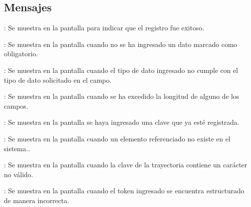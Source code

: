 \subsection{Mensajes}

\begin{Citemize}
	\item {}: Se muestra en la pantalla  para indicar que el registro fue exitoso.
	\item {}: Se muestra en la pantalla  cuando no se ha ingresado un dato marcado como obligatorio.
	\item {}: Se muestra en la pantalla  cuando el tipo de dato ingresado no cumple con el tipo de dato solicitado en el campo.
	\item {}: Se muestra en la pantalla  cuando se ha excedido la longitud de alguno de los campos.
	\item {}: Se muestra en la pantalla  se haya ingresado una clave que ya esté registrada.
	\item {}: Se muestra en la pantalla  cuando un elemento referenciado no existe en el sistema..
	\item {}: Se muestra en la pantalla  cuando la clave de la trayectoria contiene un carácter no válido.
	\item {}: Se muestra en la pantalla  cuando el token ingresado se encuentra estructurado de manera incorrecta.
\end{Citemize}
